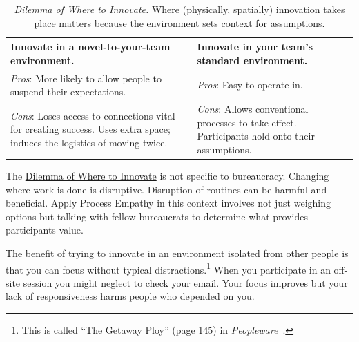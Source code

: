 \begin{center}
\begin{table}[H] %
\begin{tabular}{ | m{\dilemmatablewidth}| m{\dilemmatablewidth} | } 
  \hline
  \textbf{Innovate in a novel-to-your-team environment.} &
  \textbf{Innovate in your team's standard environment.} \\
  \hline
  \textit{Pros}: More likely to allow people to suspend their expectations.  & 
  \textit{Pros}: Easy to operate in. \\
  \hline
  \textit{Cons}: Loses access to connections vital for creating success. Uses extra space; induces the logistics of moving twice. & 
  \textit{Cons}: Allows conventional processes to take effect. Participants hold onto their assumptions. \\
  \hline
\end{tabular}
\caption{
\textit{Dilemma of Where to Innovate.}
Where (physically, spatially) innovation takes place matters because the environment sets context for assumptions.
}
\label{table:dilemma-personal-where-to-innovate}
\end{table}
\end{center}

The \hyperref[table:dilemma-personal-where-to-innovate]{Dilemma of Where to Innovate} 
\iftoggle{printedonpaper}{ (\ref{table:dilemma-personal-where-to-innovate})}{} is 
not specific to bureaucracy. Changing where work is done is disruptive. Disruption of routines can be harmful and beneficial. Apply Process Empathy in this context involves not just weighing options but talking with fellow bureaucrats to determine what provides participants value. 

The benefit of trying to innovate in an
environment isolated from other people is that you can focus without typical distractions.\footnote{This is called ``The Getaway Ploy'' (page 145) in \textit{Peopleware}~\cite{1987_DeMarco}.} When you participate in an off-site session you might neglect to check your email. Your focus improves but your lack of responsiveness harms people who depended on you.

